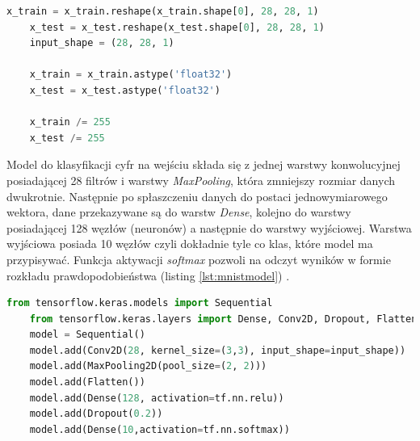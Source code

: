 \documentclass[a4paper,12pt,oneside]{book} %
\begin{document}
\begin{lstlisting}[language=Python, caption={Zmiana rozmiarów tablic i normalizacja \cite{mnistapp}}, label={lst:mnistreshape}]
	x_train = x_train.reshape(x_train.shape[0], 28, 28, 1)
	x_test = x_test.reshape(x_test.shape[0], 28, 28, 1)
	input_shape = (28, 28, 1)
	
	x_train = x_train.astype('float32')
	x_test = x_test.astype('float32')
	
	x_train /= 255
	x_test /= 255
\end{lstlisting}

Model do klasyfikacji cyfr na wejściu składa się z jednej warstwy konwolucyjnej posiadającej 28 filtrów i warstwy \emph{MaxPooling}, która zmniejszy rozmiar danych dwukrotnie. Następnie po spłaszczeniu danych do postaci jednowymiarowego wektora, dane przekazywane są do warstw \emph{Dense}, kolejno do warstwy posiadającej 128 węzłów (neuronów) a następnie do warstwy wyjściowej. Warstwa wyjściowa posiada 10 węzłów czyli dokładnie tyle co klas, które model ma przypisywać. Funkcja aktywacji \emph{softmax} pozwoli na odczyt wyników w formie rozkładu prawdopodobieństwa (listing \ref{lst:mnistmodel}) \cite{mnistapp}.

\begin{lstlisting}[language=Python, caption={Budowa modelu \cite{mnistapp}}, label={lst:mnistmodel}]
	from tensorflow.keras.models import Sequential
	from tensorflow.keras.layers import Dense, Conv2D, Dropout, Flatten, MaxPooling2D
	model = Sequential()
	model.add(Conv2D(28, kernel_size=(3,3), input_shape=input_shape))
	model.add(MaxPooling2D(pool_size=(2, 2)))
	model.add(Flatten())
	model.add(Dense(128, activation=tf.nn.relu))
	model.add(Dropout(0.2))
	model.add(Dense(10,activation=tf.nn.softmax))
\end{lstlisting}
\end{document}
